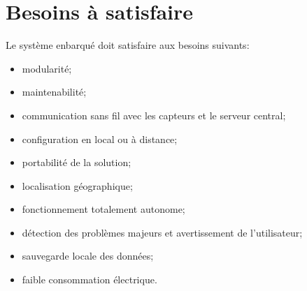 
\section{Besoins à satisfaire}
Le système enbarqué doit satisfaire aux besoins suivants:
    \begin{itemize}
        \item modularité;
        \item maintenabilité;
        \item communication sans fil avec les capteurs
                et le serveur central;
        \item configuration en local ou à distance;
        \item portabilité de la solution;
        \item localisation géographique;
        \item fonctionnement totalement autonome;
        \item détection des problèmes majeurs et
                avertissement de l'utilisateur;
        \item sauvegarde locale des données;
        \item faible consommation électrique.
    \end{itemize}
